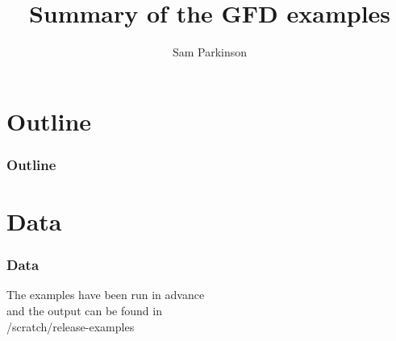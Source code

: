 \documentclass[10pt]{beamer}
\title[GFD examples]{Summary of the GFD examples}
\subtitle[]{}
\institute{Department of Earth Science and Engineering, Imperial College London}
\author[Sam Parkinson]{\large{Sam Parkinson}}
\date{}
\begin{document}
\begin{frame}
  \titlepage
\end{frame}

\section*{Outline}
\begin{frame}
  \frametitle{Outline}
  \tableofcontents
\end{frame}








\section*{Data}
\begin{frame}
  \frametitle{Data}
  \begin{center}
  The examples have been run in advance \\ and the output can be found in \\ /scratch/release-examples
  \end{center}
\end{frame}
\end{document}

